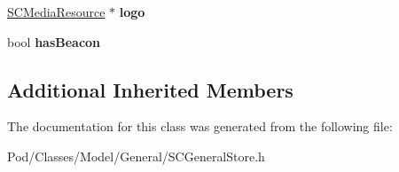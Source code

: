 \begin{DoxyCompactItemize}
\item 
\hyperlink{interface_s_c_media_resource}{S\+C\+Media\+Resource} $\ast$ {\bfseries logo}\hypertarget{interface_s_c_general_store_aa109af3f75e44bc8178883196f0cc67f}{}\label{interface_s_c_general_store_aa109af3f75e44bc8178883196f0cc67f}

\item 
bool {\bfseries has\+Beacon}\hypertarget{interface_s_c_general_store_aae9d9045bdc9ba26a662e466fba11054}{}\label{interface_s_c_general_store_aae9d9045bdc9ba26a662e466fba11054}

\end{DoxyCompactItemize}
\subsection*{Additional Inherited Members}


The documentation for this class was generated from the following file\+:\begin{DoxyCompactItemize}
\item 
Pod/\+Classes/\+Model/\+General/S\+C\+General\+Store.\+h\end{DoxyCompactItemize}
